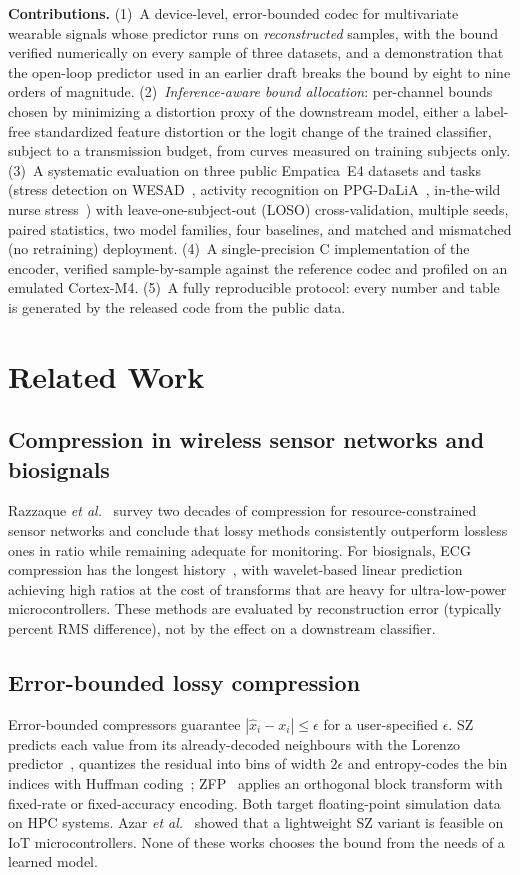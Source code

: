 \documentclass[journal]{IEEEtran}
\begin{document}
\textbf{Contributions.} (1)~A device-level, error-bounded codec for multivariate wearable signals whose predictor runs on \emph{reconstructed} samples, with the bound verified numerically on every sample of three datasets, and a demonstration that the open-loop predictor used in an earlier draft breaks the bound by eight to nine orders of magnitude. (2)~\emph{Inference-aware bound allocation}: per-channel bounds chosen by minimizing a distortion proxy of the downstream model, either a label-free standardized feature distortion or the logit change of the trained classifier, subject to a transmission budget, from curves measured on training subjects only. (3)~A systematic evaluation on three public Empatica~E4 datasets and tasks (stress detection on WESAD~\cite{schmidt2018}, activity recognition on PPG-DaLiA~\cite{reiss2019}, in-the-wild nurse stress~\cite{hosseini2022}) with leave-one-subject-out (LOSO) cross-validation, multiple seeds, paired statistics, two model families, four baselines, and matched and mismatched (no retraining) deployment. (4)~A single-precision C implementation of the encoder, verified sample-by-sample against the reference codec and profiled on an emulated Cortex-M4. (5)~A fully reproducible protocol: every number and table is generated by the released code from the public data.

\section{Related Work}
\subsection{Compression in wireless sensor networks and biosignals}
Razzaque \emph{et al.}~\cite{razzaque2013} survey two decades of compression for resource-constrained sensor networks and conclude that lossy methods consistently outperform lossless ones in ratio while remaining adequate for monitoring. For biosignals, ECG compression has the longest history~\cite{jalaleddine1990}, with wavelet-based linear prediction~\cite{ramakrishnan1997} achieving high ratios at the cost of transforms that are heavy for ultra-low-power microcontrollers. These methods are evaluated by reconstruction error (typically percent RMS difference), not by the effect on a downstream classifier.

\subsection{Error-bounded lossy compression}
Error-bounded compressors guarantee $|\hat{x}_i-x_i|\le\epsilon$ for a user-specified $\epsilon$. SZ~\cite{di2016,tao2017,liang2018} predicts each value from its already-decoded neighbours with the Lorenzo predictor~\cite{ibarria2003}, quantizes the residual into bins of width $2\epsilon$ and entropy-codes the bin indices with Huffman coding~\cite{huffman1952}; ZFP~\cite{lindstrom2014} applies an orthogonal block transform with fixed-rate or fixed-accuracy encoding. Both target floating-point simulation data on HPC systems. Azar \emph{et al.}~\cite{azar2022} showed that a lightweight SZ variant is feasible on IoT microcontrollers. None of these works chooses the bound from the needs of a learned model.
\end{document}
